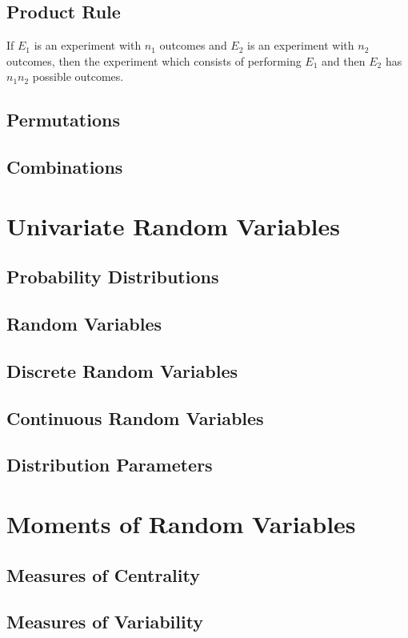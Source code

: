 \documentclass{article}
\begin{document}
\subsection{Product Rule}

If $E_1$ is an experiment with $n_1$ outcomes and $E_2$ is an experiment with $n_2$ outcomes, then the experiment which consists of performing $E_1$ and then $E_2$ has $n_1 n_2$ possible outcomes.

\subsection{Permutations}
\subsection{Combinations}

\section{Univariate Random Variables}

\subsection{Probability Distributions}
\subsection{Random Variables}
\subsection{Discrete Random Variables}
\subsection{Continuous Random Variables}
\subsection{Distribution Parameters}

\section{Moments of Random Variables}

\subsection{Measures of Centrality}
\subsection{Measures of Variability}
\end{document}
